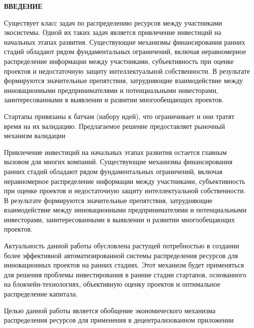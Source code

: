 \documentclass[
    14pt,
    specialist,
    candidate, %
    subf, %
    href,
    dotsinheaders=false
]{disser}
\newcommand{\myunnumberedchapter}[1]{%
  \newpage
  \hypertarget{chap:#1}{}%
  \begin{center}
    \textbf{\MakeUppercase{#1}}
  \end{center}
  \addcontentsline{toc}{chapter}{\texorpdfstring{#1}{#1}}%
}
\begin{document}
\sloppy



\renewcommand{\contentsname}{\centerline{\normalsize\bfseries\centerline{\textbf{\MakeUppercase{СОДЕРЖАНИЕ}}}}}
\setcounter{tocdepth}{1}

\tableofcontents

\myunnumberedchapter{ВВЕДЕНИЕ}

Существует класс задач по распределению ресурсов между участниками экосистемы. Одной их таких задач является привлечение инвестиций на начальных этапах развития. Существующие механизмы финансирования ранних стадий обладают рядом фундаментальных ограничений, включая неравномерное распределение информации между участниками, субъективность при оценке проектов и недостаточную защиту интеллектуальной собственности. В результате формируются значительные препятствия, затрудняющие взаимодействие между инновационными предпринимателями и потенциальными инвесторами, заинтересованными в выявлении и развитии многообещающих проектов.

Стартапы привязаны к батчам (набору идей), что ограничивает и они тратят время на их валидацию. Предлагаемое решение предоставляет рыночный механизм валидации

Привлечение инвестиций на начальных этапах развития остается главным вызовом для многих компаний. Существующие механизмы финансирования ранних стадий обладают рядом фундаментальных ограничений, включая неравномерное распределение информации между участниками, субъективность при оценке проектов и недостаточную защиту интеллектуальной собственности. В результате формируются значительные препятствия, затрудняющие взаимодействие между инновационными предпринимателями и потенциальными инвесторами, заинтересованными в выявлении и развитии многообещающих проектов.

Актуальность данной работы обусловлена растущей потребностью в создании более эффективной автоматизированной системы распределения ресурсов для инновационных проектов на ранних стадиях.
Этот механизм будет применяться для решения проблемы инвестирования в ранние стадии стартапов, основанного на блокчейн-технологиях, объективную оценку проектов и оптимальное распределение капитала.

Целью данной работы является обобщение экономического механизма распределения ресурсов для применения в децентрализованном приложении
\end{document}
